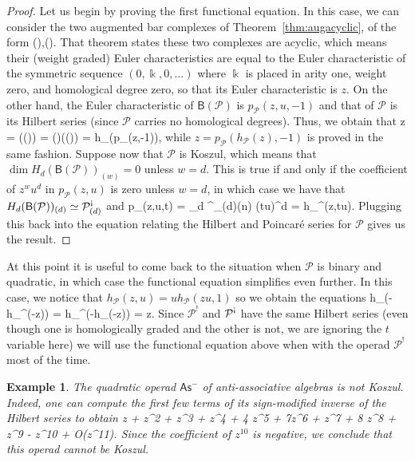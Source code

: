 \documentclass[fleqn, a4paper, twoside]{article}
\makeatletter
\newcommand{\antishriek}{\text{\raisebox{\depth}{\textexclamdown}}}
\newcommand{\0}{\langle 0\rangle}
\newcommand{\B}[1]{\mathsf{B}(#1)}
\let\[\@undefined
\DeclareRobustCommand{\[}{\begin{equation}}%
\let\]\@undefined
\DeclareRobustCommand{\]}{\end{equation}}%
\theoremstyle{mytheorem}
\theoremstyle{introthm}
\theoremstyle{mydefinition}
\newtheorem{example}[theorem]{Example}
\theoremstyle{mydefinition2}
\theoremstyle{plain} %
\newcommand{\As}{\mathsf{As}}
\newcommand{\?}{\,?\,}
\newcommand{\kk}{\Bbbk}
\newcommand{\PP}{{\mathcal{P}}}
\theoremstyle{mytheorem}
\theoremstyle{plain} %
\makeatother
\begin{document}
\begin{proof}
Let us begin by proving the first functional equation. In this case,
we can consider the two augmented bar complexes of Theorem~\ref{thm:augacyclic},
of the form
\[
\PP\circ\B{\PP},\qquad \B{\PP}\circ\PP. 
\]
That theorem states these two complexes are acyclic, which means their
(weight graded) Euler characteristics are equal to the Euler characteristic 
of the symmetric sequence $(0,\kk,0,\ldots)$ where $\kk$ is placed in arity one,
weight zero, and homological degree zero, so that its Euler characteristic is
$z$. On the other hand, the Euler characteristic of $\B{\PP}$ is
$p_\PP(z,u,-1)$ and that of $\PP$ is its Hilbert series (since $\PP$ carries no
homological degrees). Thus, we obtain that 
\[
z = \chi(\PP\circ\B{\PP}) = \chi(\PP)\circ \chi(\B{\PP}) = 
		h_\PP(p_\PP(z,-1)),
\]
while $z = p_\PP(h_\PP(z),-1)$ is proved in the same fashion. Suppose
now that $\PP$ is Koszul, which means that $\dim H_d(\B{\PP})_{(w)} = 0$
unless $w=d$. This is true if and only if the coefficient of $z^wu^d$ in
$p_\PP(z,u)$ is zero unless $w=d$, in which case we have that
$H_d(\B{\PP})_{(d)} \simeq  \PP^\antishriek_{(d)}$ and
\[
p_\PP(z,u,t) = \sum_{d} \dim \PP^\antishriek_{(d)}(n) 
	 (tu)^d = h_{\PP^\antishriek}(z,tu).
\]
Plugging this back into the equation relating the Hilbert and Poincar\'e
series for $\PP$ gives us the result.
\end{proof}

At this point it is useful to come back to the situation when $\PP$
is binary and quadratic, in which case the functional equation
simplifies even further. In this case, we notice that
$h_\PP(z,u) = u h_\PP(zu,1)$ so we obtain the equations  
\[
h_\PP(-h_{\PP^\antishriek}(-z)) = h_{\PP^\antishriek}(-h_\PP(-z)) = z. 
\]
Since $\PP^!$ and $\PP^\antishriek$ have the same Hilbert series (even
though one is homologically graded and the other is not, we are
ignoring the $t$ variable here) we will use the functional equation above
when with the operad $\PP^!$ most of the time.

\begin{example}
The quadratic operad $\As^-$ of anti-associative algebras is not Koszul.
Indeed, one can compute the first few terms of its sign-modified inverse of the 
Hilbert series to obtain
\[
z + z^2 + z^3  +  z^4 + 4 z^5  + 7z^6 + 
	 z^7 + 8 z^8
+  z^9 -  z^{10}  + \textrm{O}(z^{11}).
\]
Since the coefficient of $z^{10}$ is negative, we conclude that this operad
cannot be Koszul. 
\end{example}
\end{document}
